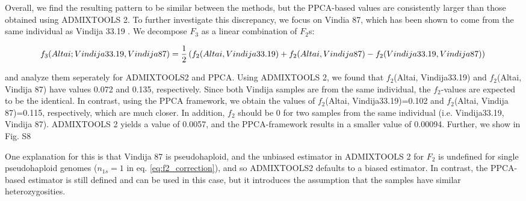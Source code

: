 \documentclass[12pt]{article}
\begin{document}
Overall, we find the resulting pattern to be similar between the methods, but the PPCA-based values are consistently larger than those obtained using ADMIXTOOLS 2. To further investigate this discrepancy, we focus on Vindia 87, which has been shown to come from the same individual as Vindija 33.19 \citep{hajdinjak_reconstructing_2018}. We decompose  $F_3$ as a linear combination of $F_2$s:

\begin{dmath}
    f_3(Altai; Vindija33.19, Vindija 87) = \frac{1}{2}\left( f_2(Altai, Vindija33.19) + f_2(Altai, Vindija 87) - f_2(Vindija33.19, Vindija 87) \right)\\
\end{dmath}

and analyze them seperately for ADMIXTOOLS2 and PPCA.
Using ADMIXTOOLS 2, we found that $f_2$(Altai, Vindija33.19) and $f_2$(Altai, Vindija 87) have values 0.072 and 0.135,  respectively. Since both Vindija samples are from the same individual, the $f_2$-values are expected to be the identical. In contrast, using the PPCA framework, we obtain the values of $f_2$(Altai, Vindija33.19)=0.102 and $f_2$(Altai, Vindija 87)=0.115, respectively, which are much closer. In addition, $f_2$ should be 0 for two samples from the same individual (i.e. Vindija33.19, Vindija 87). ADMIXTOOLS 2 yields a value of 0.0057, and the PPCA-framework results in a smaller value of 0.00094. Further, we show in Fig. S8

One explanation for this is that Vindija 87 is pseudohaploid, and the unbiased estimator in ADMIXTOOLS 2 for $F_2$ is undefined for single pseudohaploid genomes ($n_{1s}=1$ in eq. \ref{eq:f2_correction}), and so ADMIXTOOLS2 defaults to a biased estimator. In contrast, the PPCA-based estimator is still defined and can be used in this case, but it introduces the assumption that the samples have similar heterozygosities. 
\end{document}

